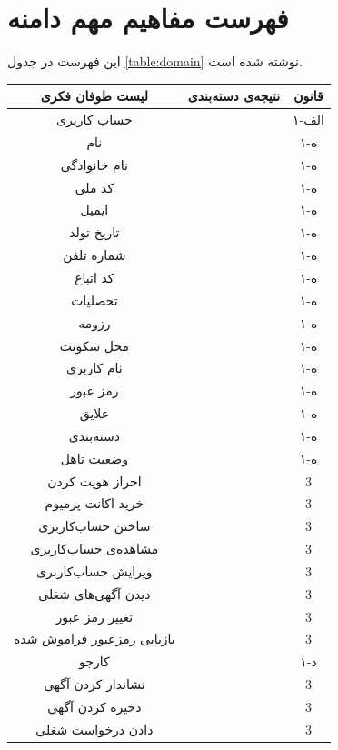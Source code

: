 \documentclass[12pt,svgnames,oneside]{book}
\newcommand{\myc}{\lr{C}}
\newcommand{\mya}{\lr{A}}
\newcommand{\asus}{\lr{AS(user, system)}}
\newcommand{\asjs}{\lr{AS(job seeker, system)}}
\newcommand{\asje}{\lr{AS(job seeker, the employer)}}
\newcommand{\onealef}{۱-الف}
\newcommand{\oneh}{۱-ه}
\newcommand{\oned}{۱-د}
\begin{document}
\section{فهرست مفاهیم مهم دامنه}
این فهرست در جدول \ref{table:domain} نوشته شده است.

\begin{longtable}{|c|c|c|}
\hline		لیست طوفان فکری &		نتیجه‌ی دسته‌بندی &		قانون \\
\hline
\hline		حساب کاربری &
\myc &
\onealef \\
\hline		نام &
\mya &
\oneh \\
\hline		نام خانوادگی &
\mya &
\oneh \\
\hline		کد ملی &
\mya &
\oneh \\
\hline		ایمیل &
\mya &
\oneh \\
\hline		تاریخ تولد &
\mya &
\oneh \\
\hline		شماره تلفن &
\mya &
\oneh \\
\hline		کد اتباع &
\mya &
\oneh \\
\hline		تحصلیات &
\mya &
\oneh \\
\hline		رزومه &
\mya &
\oneh \\
\hline		محل سکونت &
\mya &
\oneh \\
\hline		نام کاربری &
\mya &
\oneh \\
\hline		رمز عبور &
\mya &
\oneh \\
\hline		علایق &
\mya &
\oneh \\
\hline		دسته‌بندی&
\mya &
\oneh \\
\hline		وضعیت تاهل &
\mya &
\oneh \\
\hline		احراز هویت کردن &
\asus &
3 \\
\hline		خرید اکانت پرمیوم &
\asus &
3 \\
\hline		ساختن حساب‌کاربری &
\asus &
3 \\
\hline		مشاهده‌ی حساب‌کاربری &
\asus &
3 \\
\hline		ویرایش حساب‌‌کاربری &
\asus &
3 \\
\hline		دیدن آگهی‌های شغلی &
\asus &
3 \\
\hline		تغییر رمز عبور &
\asus &
3 \\
\hline		بازیابی رمزعبور فراموش شده &
\asus &
3 \\
\hline		کارجو &
\myc &
\oned \\
\hline
نشاندار کردن آگهی		&
\asjs &
3 \\
\hline
دخیره کردن آگهی &
\asjs &
3 \\
\hline
دادن درخواست شغلی &
\asje &
3 \\

\end{longtable}
\end{document}
